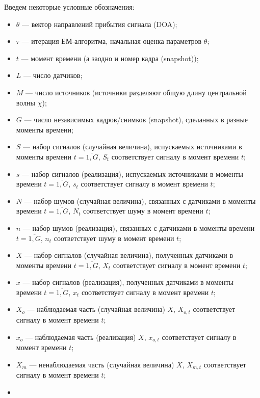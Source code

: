 \documentclass[11pt]{article}
\begin{document}
\begin{center}
\fontsize{20}{23}\selectfont {}
\end{center}
Введем некоторые условные обозначения:
\begin{itemize}
\item
$\theta$ --- вектор направлений прибытия сигнала (DOA);
\item
$\tau$ --- итерация ЕМ-алгоритма, начальная оценка параметров $\theta$;
\item
$t$ --- момент времени (а заодно и номер кадра (snapshot));
\item
$L$ --- число датчиков;
\item
$M$ --- число источников (источники разделяют общую длину центральной волны $\chi$);
\item
$G$ --- число независимых кадров/снимков (snapshot), сделанных в разные моменты времени;
\item
$S$ --- набор сигналов (случайная величина), испускаемых источниками в моменты времени $t=\overline{1,G}$, $S_t$ соответствует сигналу в момент времени $t$;
\item
$s$ --- набор сигналов (реализация), испускаемых источниками в моменты времени $t=\overline{1,G}$, $s_t$ соответствует сигналу в момент времени $t$;
\item
$N$ --- набор шумов (случайная величина), связанных с датчиками в моменты времени $t=\overline{1,G}$, $N_t$ соответствует шуму в момент времени $t$;
\item
$n$ --- набор шумов (реализация), связанных с датчиками в моменты времени $t=\overline{1,G}$, $n_t$ соответствует шуму в момент времени $t$;
\item
$X$ --- набор сигналов (случайная величина), полученных датчиками в моменты времени $t=\overline{1,G}$, $X_t$ соответствует сигналу в момент времени $t$;
\item
$x$ --- набор сигналов (реализация), полученных датчиками в моменты времени $t=\overline{1,G}$, $x_t$ соответствует сигналу в момент времени $t$;
\item
$X_o$ --- наблюдаемая часть (случайная величина) $X$, $X_{o,t}$ соответствует сигналу в момент времени $t$; 
\item
$x_o$ --- наблюдаемая часть (реализация) $X$, $x_{o,t}$ соответствует сигналу в момент времени $t$;
\item
$X_m$ --- ненаблюдаемая часть (случайная величина) $X$, $X_{m,t}$ соответствует сигналу в момент времени $t$;
\item

\end{itemize}
\end{document}
